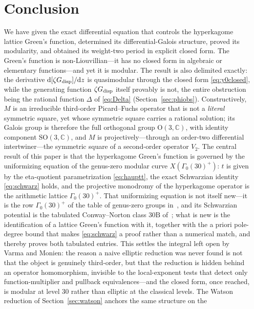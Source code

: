 \documentclass[cntp]{ipart}
\newcommand{\rmd}{\mathrm{d}}
\theoremstyle{plain}
\theoremstyle{remark}
\begin{document}
\section{Conclusion}
We have given the exact differential equation that controls the hyperkagome lattice Green's function,
determined its differential-Galois structure, proved its modularity, and obtained its weight-two period in
explicit closed form. The Green's function is non-Liouvillian---it has no closed form in algebraic or
elementary functions---and yet it is modular. The result is also delimited exactly: the derivative
$\rmd[\zeta G_{\rm disp}]/\rmd z$ is quasimodular through the closed form \eqref{eq:y0closed}, while the
generating function $\zeta G_{\rm disp}$ itself provably is not, the entire obstruction being the rational
function $\Delta$ of \eqref{eq:Delta} (Section~\ref{sec:phiobs}). Constructively, $M$ is an irreducible
third-order Picard--Fuchs operator that is not a \emph{literal} symmetric square, yet whose symmetric square
carries a rational solution; its Galois group is therefore the full orthogonal group
$\mathrm{O}(3,\mathbb{C})$, with identity component $\mathrm{SO}(3,\mathbb{C})$, and $M$ is
projectively---through an order-two differential intertwiner---the symmetric square of a second-order operator
$V_2$. The central result of this paper is that the hyperkagome Green's function is governed by the
uniformizing equation of the genus-zero modular curve $X(\Gamma_0(30)^+)$: $t$ is given by the
eta-quotient parametrization \eqref{eq:hauptt}, the exact Schwarzian identity \eqref{eq:schwarz}
holds, and the projective monodromy of the hyperkagome operator is the arithmetic lattice
$\Gamma_0(30)^+$. That uniformizing equation is not itself new---it is the row $\Gamma_0(30)^+$ of
the table of genus-zero groups in~\cite{LianYau1995}, and its Schwarzian potential is the tabulated
Conway--Norton class $30\mathrm{B}$ of~\cite{LianWiczer2006}; what is new is the identification of a
lattice Green's function with it, together with the a priori pole-degree bound that makes
\eqref{eq:schwarz} a proof rather than a numerical match, and thereby proves both tabulated
entries. This settles the integral left open by Varma and Monien: the reason a naive elliptic
reduction was never found is not that the object is genuinely third-order, but that the reduction is hidden
behind an operator homomorphism, invisible to the local-exponent tests that detect only function-multiplier
and pullback equivalences---and the closed form, once reached, is modular at level $30$ rather than elliptic
at the classical levels. The Watson reduction of Section~\ref{sec:watson} anchors the same structure on the
\end{document}

